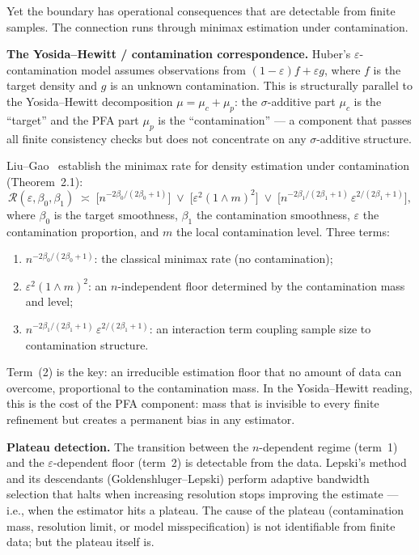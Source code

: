 Yet the boundary has operational consequences that are detectable
from finite samples.  The connection runs through minimax estimation
under contamination.

\medskip\noindent
\textbf{The Yosida--Hewitt / contamination correspondence.}
Huber's $\varepsilon$-contamination model assumes observations from
$(1-\varepsilon)f + \varepsilon g$, where $f$ is the target density
and $g$ is an unknown contamination.  This is structurally parallel
to the Yosida--Hewitt decomposition $\mu = \mu_c + \mu_p$: the
$\sigma$-additive part $\mu_c$ is the ``target'' and the PFA part
$\mu_p$ is the ``contamination'' --- a component that passes all
finite consistency checks but does not concentrate on any
$\sigma$-additive structure.

Liu--Gao~\cite{LiuGao2019} establish the minimax rate for density
estimation under contamination (Theorem~2.1):
\[
  \mathcal{R}(\varepsilon, \beta_0, \beta_1)
  \;\asymp\;
  \bigl[n^{-2\beta_0/(2\beta_0+1)}\bigr]
  \;\vee\;
  \bigl[\varepsilon^2(1 \wedge m)^2\bigr]
  \;\vee\;
  \bigl[n^{-2\beta_1/(2\beta_1+1)}\,
    \varepsilon^{2/(2\beta_1+1)}\bigr],
\]
where $\beta_0$ is the target smoothness, $\beta_1$ the
contamination smoothness, $\varepsilon$ the contamination
proportion, and $m$ the local contamination level.  Three terms:
\begin{enumerate}[nosep]
  \item $n^{-2\beta_0/(2\beta_0+1)}$: the classical minimax rate
    (no contamination);
  \item $\varepsilon^2(1 \wedge m)^2$: an $n$-independent floor
    determined by the contamination mass and level;
  \item $n^{-2\beta_1/(2\beta_1+1)}\,
    \varepsilon^{2/(2\beta_1+1)}$: an interaction term coupling
    sample size to contamination structure.
\end{enumerate}
Term~(2) is the key: an irreducible estimation floor that no amount
of data can overcome, proportional to the contamination mass.  In
the Yosida--Hewitt reading, this is the cost of the PFA component:
mass that is invisible to every finite refinement but creates a
permanent bias in any estimator.

\medskip\noindent
\textbf{Plateau detection.}  The transition between the
$n$-dependent regime (term~1) and the $\varepsilon$-dependent floor
(term~2) is detectable from the data.  Lepski's
method~\cite{Lepski1991} and its descendants (Goldenshluger--Lepski)
perform adaptive bandwidth selection that halts when increasing
resolution stops improving the estimate --- i.e., when the estimator
hits a plateau.  The cause of the plateau (contamination mass,
resolution limit, or model misspecification) is not identifiable
from finite data; but the plateau itself is.

